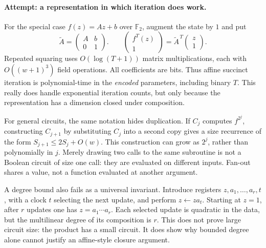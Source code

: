 \documentclass[11pt,a4paper]{article}
\newcommand{\F}{\mathbb{F}}
\begin{document}
\paragraph{Attempt: a representation in which iteration does work.}
For the special case $f(z)=Az+b$ over $\F_2$, augment the state by $1$ and
put
\[
 \widetilde A=\begin{pmatrix}A&b\\0&1\end{pmatrix}.
 \qquad
 \begin{pmatrix}f^T(z)\\1\end{pmatrix}
 =\widetilde A^{\,T}\begin{pmatrix}z\\1\end{pmatrix}. \tag{14.3}
\]
Repeated squaring uses $O(\log(T+1))$ matrix multiplications, each with
$O((w+1)^3)$ field operations. All coefficients are bits. Thus affine
succinct iteration is polynomial-time in the \emph{encoded} parameters,
including binary $T$. This really does handle exponential iteration
counts, but only because the representation has a dimension closed
under composition.

For general circuits, the same notation hides duplication. If $C_j$
computes $f^{2^j}$, constructing $C_{j+1}$ by substituting $C_j$ into a
second copy gives a size recurrence of the form
$S_{j+1}\leq2S_j+O(w)$. This construction can grow as $2^j$, rather than
polynomially in $j$. Merely drawing two calls to the same subroutine is
not a Boolean circuit of size one call: they are evaluated on different
inputs. Fan-out shares a value, not a function evaluated at another
argument.

A degree bound also fails as a universal invariant. Introduce registers
$z,a_1,\ldots,a_r,t$, with a clock $t$ selecting the next update, and
perform $z\leftarrow za_t$. Starting at $z=1$, after $r$ updates one has
$z=a_1\cdots a_r$. Each selected update is quadratic in the data, but the
multilinear degree of its composition is $r$. This does not prove large
circuit size: the product has a small circuit. It does show why bounded
degree alone cannot justify an affine-style closure argument.
\end{document}

